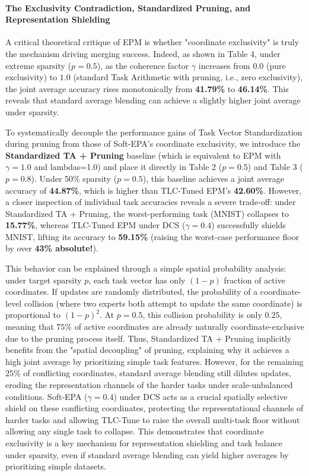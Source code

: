 \paragraph{The Exclusivity Contradiction, Standardized Pruning, and Representation Shielding}
A critical theoretical critique of EPM is whether "coordinate exclusivity" is truly the mechanism driving merging success. Indeed, as shown in Table 4, under extreme sparsity ($p=0.5$), as the coherence factor $\gamma$ increases from $0.0$ (pure exclusivity) to $1.0$ (standard Task Arithmetic with pruning, i.e., zero exclusivity), the joint average accuracy rises monotonically from \textbf{41.79\%} to \textbf{46.14\%}. This reveals that standard average blending can achieve a slightly higher joint average under sparsity. 

To systematically decouple the performance gains of Task Vector Standardization during pruning from those of Soft-EPA's coordinate exclusivity, we introduce the \textbf{Standardized TA + Pruning} baseline (which is equivalent to EPM with $\gamma=1.0$ and lambdas=1.0) and place it directly in Table 2 ($p=0.5$) and Table 3 ($p=0.8$). Under 50\% sparsity ($p=0.5$), this baseline achieves a joint average accuracy of \textbf{44.87\%}, which is higher than TLC-Tuned EPM's \textbf{42.60\%}. However, a closer inspection of individual task accuracies reveals a severe trade-off: under Standardized TA + Pruning, the worst-performing task (MNIST) collapses to \textbf{15.77\%}, whereas TLC-Tuned EPM under DCS ($\gamma=0.4$) successfully shields MNIST, lifting its accuracy to \textbf{59.15\%} (raising the worst-case performance floor by over \textbf{43\% absolute!}). 

This behavior can be explained through a simple spatial probability analysis: under target sparsity $p$, each task vector has only $(1-p)$ fraction of active coordinates. If updates are randomly distributed, the probability of a coordinate-level collision (where two experts both attempt to update the same coordinate) is proportional to $(1-p)^2$. At $p=0.5$, this collision probability is only $0.25$, meaning that $75\%$ of active coordinates are already naturally coordinate-exclusive due to the pruning process itself. Thus, Standardized TA + Pruning implicitly benefits from the "spatial decoupling" of pruning, explaining why it achieves a high joint average by prioritizing simple task features. However, for the remaining $25\%$ of conflicting coordinates, standard average blending still dilutes updates, eroding the representation channels of the harder tasks under scale-unbalanced conditions. Soft-EPA ($\gamma=0.4$) under DCS acts as a crucial spatially selective shield on these conflicting coordinates, protecting the representational channels of harder tasks and allowing TLC-Tune to raise the overall multi-task floor without allowing any single task to collapse. This demonstrates that coordinate exclusivity is a key mechanism for representation shielding and task balance under sparsity, even if standard average blending can yield higher averages by prioritizing simple datasets.


